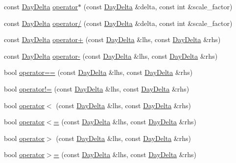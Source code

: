 \begin{DoxyCompactItemize}
\item 
const \hyperlink{structDayDelta}{\-Day\-Delta} \hyperlink{structDayDelta_af888d4911eda6f27731cbf92bb393c32}{operator$\ast$} (const \hyperlink{structDayDelta}{\-Day\-Delta} \&delta, const int \&scale\-\_\-factor)
\item 
const \hyperlink{structDayDelta}{\-Day\-Delta} \hyperlink{structDayDelta_a9469df031e6aba7593890989a954ae35}{operator/} (const \hyperlink{structDayDelta}{\-Day\-Delta} \&delta, const int \&scale\-\_\-factor)
\item 
const \hyperlink{structDayDelta}{\-Day\-Delta} \hyperlink{structDayDelta_a371e4babc2d194244a5b4cea3ea66d7e}{operator+} (const \hyperlink{structDayDelta}{\-Day\-Delta} \&lhs, const \hyperlink{structDayDelta}{\-Day\-Delta} \&rhs)
\item 
const \hyperlink{structDayDelta}{\-Day\-Delta} \hyperlink{structDayDelta_a1b59f350f113499fac66fe2f180fca7a}{operator-\/} (const \hyperlink{structDayDelta}{\-Day\-Delta} \&lhs, const \hyperlink{structDayDelta}{\-Day\-Delta} \&rhs)
\item 
bool \hyperlink{structDayDelta_a04f6712422789b8ec3f19d3e1789bf4f}{operator==} (const \hyperlink{structDayDelta}{\-Day\-Delta} \&lhs, const \hyperlink{structDayDelta}{\-Day\-Delta} \&rhs)
\item 
bool \hyperlink{structDayDelta_ad0581c91724489d68bd79382831a5a1e}{operator!=} (const \hyperlink{structDayDelta}{\-Day\-Delta} \&lhs, const \hyperlink{structDayDelta}{\-Day\-Delta} \&rhs)
\item 
bool \hyperlink{structDayDelta_ad6792531d3979ec77fd7ddce40a1a496}{operator$<$} (const \hyperlink{structDayDelta}{\-Day\-Delta} \&lhs, const \hyperlink{structDayDelta}{\-Day\-Delta} \&rhs)
\item 
bool \hyperlink{structDayDelta_abdcc1adeaad32dd0ae90569e52f514dd}{operator$<$=} (const \hyperlink{structDayDelta}{\-Day\-Delta} \&lhs, const \hyperlink{structDayDelta}{\-Day\-Delta} \&rhs)
\item 
bool \hyperlink{structDayDelta_aaf9360c064df44a15781807e4a26c296}{operator$>$} (const \hyperlink{structDayDelta}{\-Day\-Delta} \&lhs, const \hyperlink{structDayDelta}{\-Day\-Delta} \&rhs)
\item 
bool \hyperlink{structDayDelta_a78c4c340fdd0331b761215aeb08f56e6}{operator$>$=} (const \hyperlink{structDayDelta}{\-Day\-Delta} \&lhs, const \hyperlink{structDayDelta}{\-Day\-Delta} \&rhs)
\end{DoxyCompactItemize}



